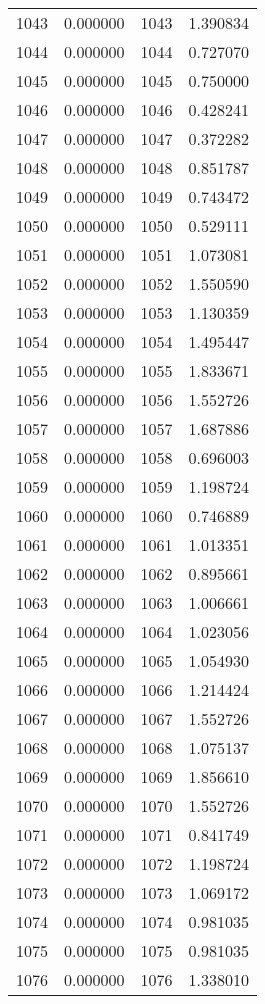 \documentclass[12pt]{article}
\begin{document}
\begin{longtable}{@{}cccc@{}}
1043 & 0.000000 & 1043 & 1.390834 \\
1044 & 0.000000 & 1044 & 0.727070 \\
1045 & 0.000000 & 1045 & 0.750000 \\
1046 & 0.000000 & 1046 & 0.428241 \\
1047 & 0.000000 & 1047 & 0.372282 \\
1048 & 0.000000 & 1048 & 0.851787 \\
1049 & 0.000000 & 1049 & 0.743472 \\
1050 & 0.000000 & 1050 & 0.529111 \\
1051 & 0.000000 & 1051 & 1.073081 \\
1052 & 0.000000 & 1052 & 1.550590 \\
1053 & 0.000000 & 1053 & 1.130359 \\
1054 & 0.000000 & 1054 & 1.495447 \\
1055 & 0.000000 & 1055 & 1.833671 \\
1056 & 0.000000 & 1056 & 1.552726 \\
1057 & 0.000000 & 1057 & 1.687886 \\
1058 & 0.000000 & 1058 & 0.696003 \\
1059 & 0.000000 & 1059 & 1.198724 \\
1060 & 0.000000 & 1060 & 0.746889 \\
1061 & 0.000000 & 1061 & 1.013351 \\
1062 & 0.000000 & 1062 & 0.895661 \\
1063 & 0.000000 & 1063 & 1.006661 \\
1064 & 0.000000 & 1064 & 1.023056 \\
1065 & 0.000000 & 1065 & 1.054930 \\
1066 & 0.000000 & 1066 & 1.214424 \\
1067 & 0.000000 & 1067 & 1.552726 \\
1068 & 0.000000 & 1068 & 1.075137 \\
1069 & 0.000000 & 1069 & 1.856610 \\
1070 & 0.000000 & 1070 & 1.552726 \\
1071 & 0.000000 & 1071 & 0.841749 \\
1072 & 0.000000 & 1072 & 1.198724 \\
1073 & 0.000000 & 1073 & 1.069172 \\
1074 & 0.000000 & 1074 & 0.981035 \\
1075 & 0.000000 & 1075 & 0.981035 \\
1076 & 0.000000 & 1076 & 1.338010 \\

\end{longtable}
\end{document}
